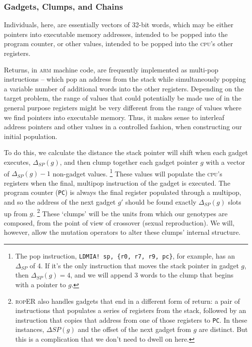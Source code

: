 \subsubsection{Gadgets, Clumps, and Chains}

Individuals, here, are essentially vectors of 32-bit words, which
may be either pointers into executable memory addresses, intended
to be popped into the program counter, or other values, intended
to be popped into the \textsc{cpu}'s other registers. 

Returns, in \textsc{arm} machine code, are frequently implemented as
multi-pop instructions -- which pop an address from the stack
while simultaneously popping a variable number of additional
words into the other registers. Depending on the target problem, the range of values that could potentially be
made use of in the general purpose registers might be very
different from the range of values where we find pointers into
executable memory. Thus, it makes sense to interleaf address
pointers and other values in a controlled fashion, when
constructing our initial population. 

To do this, we calculate the distance the stack pointer will shift
when each gadget executes, $\Delta_{SP}(g)$, and then clump
together each gadget pointer $g$ with a vector of
$\Delta_{SP}(g)-1$ non-gadget values.
\footnote{The pop instruction, \texttt{LDMIA! sp, \{r0, r7, 
  r9, pc\}},
  for example, has an $\Delta_{SP}$ of 4. If it's the only
  instruction that moves the stack pointer in gadget $g$, then
  $\Delta_{SP}(g) = 4$, and we will append 3 words to the clump
  that begins with a pointer to $g$.}
These values will populate
the \textsc{cpu}'s registers when the final, multipop instruction of the
gadget is executed. The program counter (\texttt{PC}) is always
the final register populated through a multipop, and so the
address of the next gadget $g'$ should be found exactly
$\Delta_{SP}(g)$ slots up from $g$.%
\footnote{\textsc{rop}ER also handles gadgets that end in a different
  form of return: a pair of instructions that populates a series
  of registers from the stack, followed by an instruction that
  copies that address from one of those registers to \texttt{PC}.
  In these instances, $\Delta{SP}(g)$ and the offset of the next
  gadget from $g$ are distinct. But this is a complication that
  we don't need to dwell on here.}
These `clumps' will be the units from which our genotypes are composed,
from the point of view of crossover (sexual reproduction). We will,
however, allow the mutation operators to alter these clumps' internal structure. 



